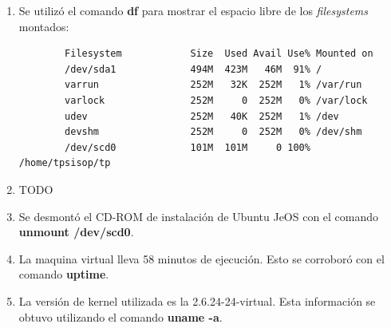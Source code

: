 \documentclass[a4paper,11pt] {article}
\begin{document}
\begin{enumerate}
	\begin{verbatim}
		-r-xr-xr-x 1 root root   942 2008-04-22 03:07 cdromupgrade
		dr-xr-xr-x 3 root root  2048 2009-07-14 13:23 dists
		dr-xr-xr-x 3 root root  2048 2009-07-14 13:23 doc
		dr-xr-xr-x 3 root root  2048 2009-07-14 13:24 install
		dr-xr-xr-x 2 root root 12288 2009-07-14 13:24 isolinux
		-r--r--r-- 1 root root 47110 2009-07-14 13:24 md5sum.txt
		dr-xr-xr-x 2 root root  2048 2009-07-14 13:23 pics
		dr-xr-xr-x 4 root root  2048 2009-07-14 13:23 pool
		dr-xr-xr-x 2 root root  2048 2009-07-14 13:23 preseed
		-r--r--r-- 1 root root   228 2009-07-14 13:23 README.diskdefines
		lr-xr-xr-x 1 root root     1 2009-07-14 13:23 ubuntu -> .
	\end{verbatim}
	Se utilizó el comando \textbf{mount} para mostrar los siguientes \textit{filesystems} montados:
	\begin{verbatim}
		/dev/sda1 on / type ext3 (rw,relatime,errors=remount-ro)
		proc on /proc type proc (rw,noexec,nosuid,nodev)
		/sys on /sys type sysfs (rw,noexec,nosuid,nodev)
		varrun on /var/run type tmpfs (rw,noexec,nosuid,nodev,mode=0755)
		varlock on /var/lock type tmpfs (rw,noexec,nosuid,nodev,mode=1777)
		udev on /dev type tmpfs (rw,mode=0755)
		devshm on /dev/shm type tmpfs (rw)
		devpts on /dev/pts type devpts (rw,gid=5,mode=620)
		/dev/scd0 on /home/tpsisop/tp type iso9660 (ro)
	\end{verbatim}
	\item Se utilizó el comando \textbf{df} para mostrar el espacio libre de los \textit{filesystems} montados:
	\begin{verbatim}
		Filesystem            Size  Used Avail Use% Mounted on
		/dev/sda1             494M  423M   46M  91% /
		varrun                252M   32K  252M   1% /var/run
		varlock               252M     0  252M   0% /var/lock
		udev                  252M   40K  252M   1% /dev
		devshm                252M     0  252M   0% /dev/shm
		/dev/scd0             101M  101M     0 100% /home/tpsisop/tp
	\end{verbatim}
	\item TODO
	\item Se desmont\'o el CD-ROM de instalaci\'on de Ubuntu JeOS con el comando \textbf{unmount /dev/scd0}.
	\item La maquina virtual lleva 58 minutos de ejecuci\'on. Esto se corrobor\'o con el comando \textbf{uptime}.
	\item La versi\'on de kernel utilizada es la 2.6.24-24-virtual. Esta informaci\'on se obtuvo utilizando el comando \textbf{uname -a}.

\end{enumerate}
\end{document}
